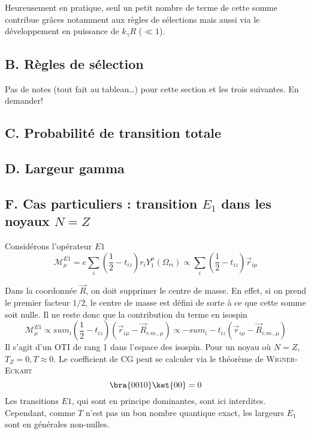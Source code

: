 Heureusement en pratique, seul un petit nombre de terme de cette somme contribue grâces notamment aux 
règles de sélections mais aussi via le développement en puissance de $k_\gamma R$ ($\ll 1$).

\subsection{B. Règles de sélection}
Pas de notes (tout fait au tableau\dots) pour cette section et les trois suivantes. En demander!
\subsection{C. Probabilité de transition totale}
\subsection{D. Largeur gamma}
\subsection{F. Cas particuliers : transition $E_1$ dans les noyaux $N=Z$}
Considérons l'opérateur $E1$
\begin{equation}
\mathcal{M}_\mu^{E1} = e\sum_i\left(\frac{1}{2}-t_{iz}\right)r_iY_1^\mu(\Omega_{ri})\propto \sum_i
\left(\frac{1}{2}-t_{iz}\right)\vec{r}_{i\mu}
\end{equation}

Dans la coordonnée $\vec{R}$, on doit supprimer le centre de masse. En effet, si on prend le premier
facteur $1/2$, le centre de masse est défini de sorte à ce que cette somme soit nulle. Il ne reste donc
que la contribution du terme en isospin
\begin{equation}
\mathcal{M}_\mu^{E1} \propto sum_i\left(\frac{1}{2}-t_{iz}\right)(\vec{r}_{i\mu}-\vec{R}_{c.m.,\mu})
\propto -sum_i-t_{iz}(\vec{r}_{i\mu}-\vec{R}_{c.m.,\mu})
\end{equation}
Il s'agit d'un OTI de rang 1 dans l'espace des isospin. Pour un noyau où $N=Z$, $T_Z=0, T\approx0$. Le 
coefficient de CG peut se calculer via le théorème de \textsc{Wigner-Eckart}
\begin{equation}
\bra{0010}\ket{00} = 0
\end{equation}
Les transitions $E1$, qui sont en principe dominantes, sont ici interdites. Cependant, comme $T$ n'est 
pas un bon nombre quantique exact, les largeurs $E_1$ sont en générales non-nulles.





